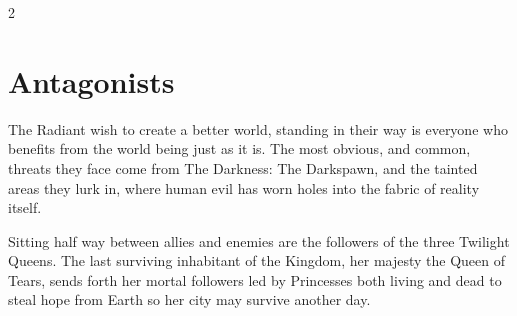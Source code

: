 \begin{multicols}{2}

\section*{Antagonists}

The Radiant wish to create a better world, standing in their way is everyone who benefits from the world being just as it is. The most obvious, and common, threats they face come from The Darkness: The Darkspawn, and the tainted areas they lurk in, where human evil has worn holes into the fabric of reality itself. 

Sitting half way between allies and enemies are the followers of the three Twilight Queens. The last surviving inhabitant of the Kingdom, her majesty the Queen of Tears, sends forth her mortal followers led by Princesses both living and dead to steal hope from Earth so her city may survive another day. 


\end{multicols}
